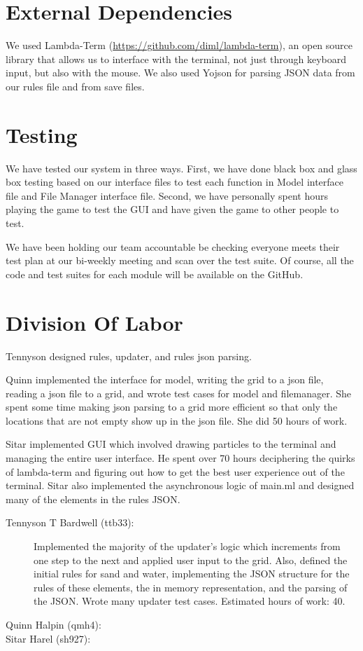 \section{External Dependencies}
We used Lambda-Term (\url{https://github.com/diml/lambda-term}), an open source library that allows us to interface with the terminal, not just through keyboard input, but also with the mouse. We also used Yojson for parsing JSON data from our rules file and from save files.

\section{Testing}
We have tested our system in three ways. First, we have done black box and glass box testing based on our interface files to test each function in Model interface file and File Manager interface file. Second, we have
personally spent hours playing the game to test the GUI and have given the game to other people to test. 

We have been holding our team accountable be checking everyone meets their test plan at our bi-weekly meeting and scan over the test suite. Of course, all the code and test suites for each module will be available on the GitHub.

\section{Division Of Labor}
Tennyson designed rules, updater, and rules json parsing. 

Quinn implemented the interface for model, writing the grid to a json file, 
reading a json file to a grid, and wrote test cases for model and filemanager. 
She spent some time making json parsing to a grid more efficient so that only the 
locations that are not empty show up in the json file. She did 50 hours of work.

Sitar implemented GUI which involved drawing particles to the terminal and 
managing the entire user interface. He spent over 70 hours deciphering the quirks 
of lambda-term and figuring out how to get the best user experience out of the terminal.
Sitar also implemented the asynchronous logic of main.ml and designed many of 
the elements in the rules JSON.


\begin{description}
  \item[Tennyson T Bardwell (ttb33):]
    Implemented the majority of the updater's logic which increments from one step to the next and applied user input to the grid. Also, defined the initial rules for sand and water, implementing the JSON structure for the rules of these elements, the in memory representation, and the parsing of the JSON. Wrote many updater test cases. Estimated hours of work: 40.
  \item[Quinn Halpin (qmh4):]
  \item[Sitar Harel (sh927):]
\end{description}



